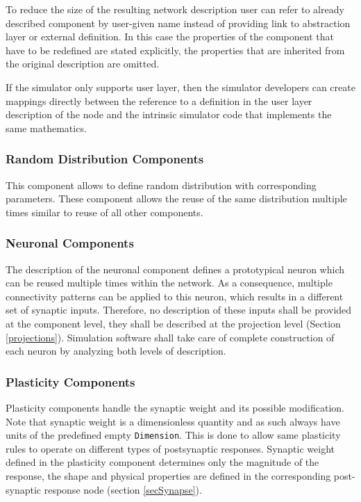 \documentclass{article}
\begin{document}
To reduce the size of the resulting network description user can refer to
already described component by user-given name instead of providing link to
abstraction layer or external definition. In this case the properties of the
component that have to be redefined are stated explicitly, the properties that
are inherited from the original description are omitted.

If the simulator only supports user layer, then the simulator developers
can create mappings directly between the reference to a definition in the user
layer description of the node and the intrinsic simulator code that implements
the same mathematics.

\subsubsection{Random Distribution Components}
\label{randDist}

This component allows to define random distribution with corresponding
parameters. These component allows the reuse of the same distribution
multiple times similar to reuse of all other components.

\subsubsection{Neuronal Components}
\label{neuron}

The description of the neuronal component defines a prototypical neuron
which can be reused multiple times within the network. As a consequence,
multiple connectivity patterns can be applied to this neuron, which
results in a different set of synaptic inputs. Therefore, no description
of these inputs shall be provided at the component level, they shall be
described at the projection level (Section \ref{projections}). Simulation
software shall take care of complete construction of each neuron by
analyzing both levels of description.

\subsubsection{Plasticity Components}
\label{plasticity}

Plasticity components handle the synaptic weight and its possible
modification. Note that synaptic weight is a dimensionless quantity and
as such always have units of the predefined empty {\tt Dimension}. This
is done to allow same plasticity rules to operate on
different types of postsynaptic responses. Synaptic weight defined in the
plasticity component determines only the magnitude of the response, the
shape and physical properties are defined in the corresponding post-synaptic
response node (section \ref{secSynapse}).
\end{document}
